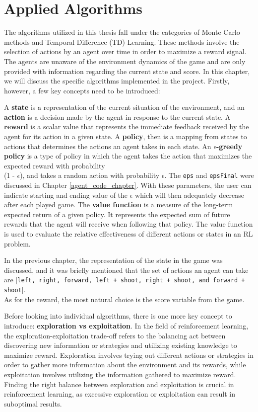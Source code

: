 \chapter{Applied Algorithms}
The algorithms utilized in this thesis fall under the categories of Monte Carlo methods and Temporal Difference (TD) Learning. These methods involve the selection of actions by an agent over time in order to maximize a reward signal. The agents are unaware of the environment dynamics of the game and are only provided with information regarding the current state and score. In this chapter, we will discuss the specific algorithms implemented in the project. Firstly, however, a few key concepts need to be introduced:

A \textbf{state} is a representation of the current situation of the environment, and an \textbf{action} is a decision made by the agent in response to the current state. A \textbf{reward} is a scalar value that represents the immediate feedback received by the agent for its action in a given state. A \textbf{policy}, then is a mapping from states to actions that determines the actions an agent takes in each state. An \textbf{$\epsilon$-greedy policy} is a type of policy in which the agent takes the action that maximizes the expected reward with probability \\ (1 - $\epsilon$), and takes a random action with probability $\epsilon$. The \texttt{eps} and \texttt{epsFinal} were discussed in Chapter \ref{agent_code_chapter}. With these parameters, the user can indicate starting and ending value of the $\epsilon$ which will then adequately decrease after each played game. The \textbf{value function} is a measure of the long-term expected return of a given policy. It represents the expected sum of future rewards that the agent will receive when following that policy. The value function is used to evaluate the relative effectiveness of different actions or states in an RL problem.

In the previous chapter, the representation of the state in the game was discussed, and it was briefly mentioned that the set of actions an agent can take are [\texttt{left, right, forward, left + shoot, right + shoot, and forward + shoot}].\\ As for the reward, the most natural choice is the score variable from the game.

Before looking into individual algorithms, there is one more key concept to introduce: \textbf{exploration vs exploitation}. In the field of reinforcement learning, the exploration-exploitation trade-off refers to the balancing act between discovering new information or strategies and utilizing existing knowledge to maximize reward. Exploration involves trying out different actions or strategies in order to gather more information about the environment and its rewards, while exploitation involves utilizing the information gathered to maximize reward. Finding the right balance between exploration and exploitation is crucial in reinforcement learning, as excessive exploration or exploitation can result in suboptimal results.

